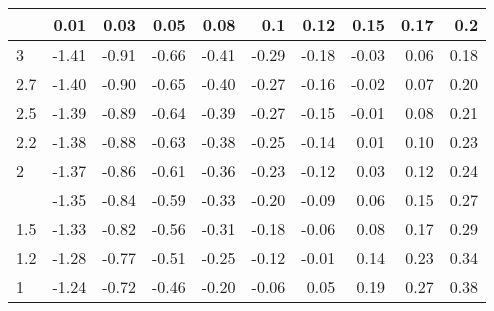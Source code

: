 
\begin{tabular}{lrrrrrrrrr}
\toprule
  & 0.01 & 0.03 & 0.05 & 0.08 & 0.1 & 0.12 & 0.15 & 0.17 & 0.2\\
\midrule
3 & -1.41 & -0.91 & -0.66 & -0.41 & -0.29 & -0.18 & -0.03 & 0.06 & 0.18\\
2.7 & -1.40 & -0.90 & -0.65 & -0.40 & -0.27 & -0.16 & -0.02 & 0.07 & 0.20\\
2.5 & -1.39 & -0.89 & -0.64 & -0.39 & -0.27 & -0.15 & -0.01 & 0.08 & 0.21\\
2.2 & -1.38 & -0.88 & -0.63 & -0.38 & -0.25 & -0.14 & 0.01 & 0.10 & 0.23\\
2 & -1.37 & -0.86 & -0.61 & -0.36 & -0.23 & -0.12 & 0.03 & 0.12 & 0.24\\
\addlinespace
1.7 & -1.35 & -0.84 & -0.59 & -0.33 & -0.20 & -0.09 & 0.06 & 0.15 & 0.27\\
1.5 & -1.33 & -0.82 & -0.56 & -0.31 & -0.18 & -0.06 & 0.08 & 0.17 & 0.29\\
1.2 & -1.28 & -0.77 & -0.51 & -0.25 & -0.12 & -0.01 & 0.14 & 0.23 & 0.34\\
1 & -1.24 & -0.72 & -0.46 & -0.20 & -0.06 & 0.05 & 0.19 & 0.27 & 0.38\\
\bottomrule
\end{tabular}
